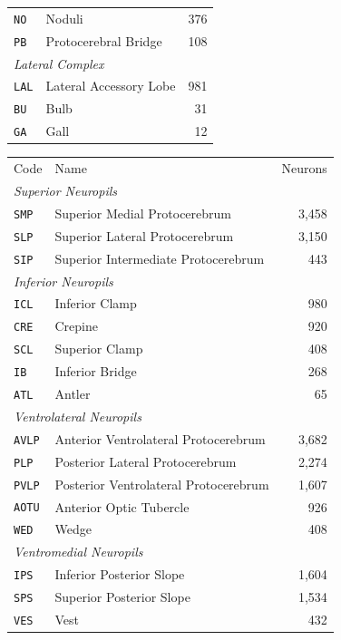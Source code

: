 \documentclass[12pt,a4paper,oneside]{article}
\theoremstyle{definition}
\theoremstyle{plain}
\newcommand{\code}[1]{\texttt{#1}}
\begin{document}
\begin{table}[t]
\begin{minipage}[t]{0.49\textwidth}
\begin{tabular}{llr}
\code{NO} & Noduli & 376 \\
\code{PB} & Protocerebral Bridge & 108 \\
\midrule
\multicolumn{3}{l}{\textit{Lateral Complex}} \\
\code{LAL} & Lateral Accessory Lobe & 981 \\
\code{BU} & Bulb & 31 \\
\code{GA} & Gall & 12 \\
\midrule
\bottomrule
\end{tabular}
\end{minipage}\hfill
\begin{minipage}[t]{0.49\textwidth}
\vspace{0pt}
\centering
\begin{tabular}{llr}
\toprule
Code & Name & Neurons \\
\multicolumn{3}{l}{\textit{Superior Neuropils}} \\
\code{SMP} & Superior Medial Protocerebrum & 3{,}458 \\
\code{SLP} & Superior Lateral Protocerebrum & 3{,}150 \\
\code{SIP} & Superior Intermediate Protocerebrum & 443 \\
\midrule
\multicolumn{3}{l}{\textit{Inferior Neuropils}} \\
\code{ICL} & Inferior Clamp & 980 \\
\code{CRE} & Crepine & 920 \\
\code{SCL} & Superior Clamp & 408 \\
\code{IB} & Inferior Bridge & 268 \\
\code{ATL} & Antler & 65 \\
\midrule
\multicolumn{3}{l}{\textit{Ventrolateral Neuropils}} \\
\code{AVLP} & Anterior Ventrolateral Protocerebrum & 3{,}682 \\
\code{PLP} & Posterior Lateral Protocerebrum & 2{,}274 \\
\code{PVLP} & Posterior Ventrolateral Protocerebrum & 1{,}607 \\
\code{AOTU} & Anterior Optic Tubercle & 926 \\
\code{WED} & Wedge & 408 \\
\midrule
\multicolumn{3}{l}{\textit{Ventromedial Neuropils}} \\
\code{IPS} & Inferior Posterior Slope & 1{,}604 \\
\code{SPS} & Superior Posterior Slope & 1{,}534 \\
\code{VES} & Vest & 432 \\

\end{tabular}
\end{minipage}
\end{table}
\end{document}
